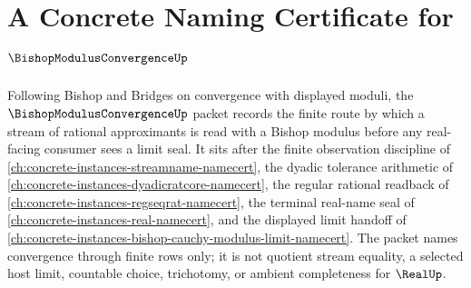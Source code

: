 \chapter{A Concrete Naming Certificate for $\BishopModulusConvergenceUp$}
\label{ch:concrete-instances-bishop-modulus-convergence-namecert}

Following Bishop and Bridges on convergence with displayed moduli, the $\BishopModulusConvergenceUp$ packet records the finite route by which a stream of rational approximants is read with a Bishop modulus before any real-facing consumer sees a limit seal. It sits after the finite observation discipline of \autoref{ch:concrete-instances-streamname-namecert}, the dyadic tolerance arithmetic of \autoref{ch:concrete-instances-dyadicratcore-namecert}, the regular rational readback of \autoref{ch:concrete-instances-regseqrat-namecert}, the terminal real-name seal of \autoref{ch:concrete-instances-real-namecert}, and the displayed limit handoff of \autoref{ch:concrete-instances-bishop-cauchy-modulus-limit-namecert}. The packet names convergence through finite rows only; it is not quotient stream equality, a selected host limit, countable choice, trichotomy, or ambient completeness for $\RealUp$.

